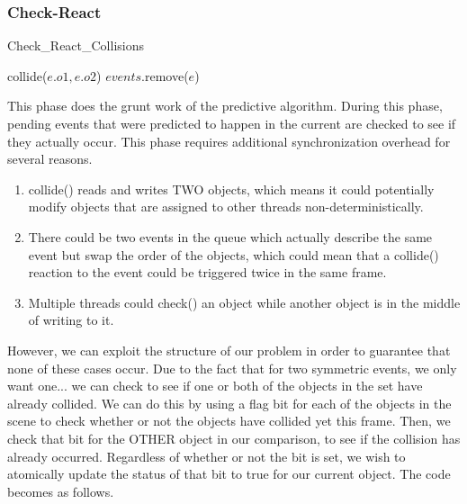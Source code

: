 \documentclass[CEJCS,PDF]{cej} %
\begin{document}
\subsubsection{Check-React}
\label{sub:checkreact}
\begin{algorithm}
\caption{Check\_React\_Collisions}
\begin{algorithmic}
\STATE {}
	\STATE {}
		\STATE {}
		\STATE collide($e.o1,e.o2$)
	\ENDIF
	\STATE {}
	\STATE $events$.remove($e$)
\ENDFOR
\end{algorithmic}
\end{algorithm}
This phase does the grunt work of the predictive algorithm.  During this phase, pending events that were predicted to happen in the current  are checked to see if they actually occur.  This phase requires additional synchronization overhead for several reasons.

\begin{enumerate}
	\item collide() reads and writes TWO objects, which means it could potentially modify objects that are assigned to other threads non-deterministically.
	\item There could be two events in the queue which actually describe the same event but swap the order of the objects, which could mean that a collide() reaction to the event could be triggered twice in the same frame.
	\item Multiple threads could check() an object while another object is in the middle of writing to it.
\end{enumerate}

However, we can exploit the structure of our problem in order to guarantee that none of these cases occur.  Due to the fact that for two symmetric events, we only want one... we can check to see if one or both of the objects in the set have already collided.
We can do this by using a flag bit for each of the objects in the scene to check whether or not the objects have collided yet this frame.  Then, we check
that bit for the OTHER object in our comparison, to see if the collision has already occurred.  Regardless of whether or not the bit is set, we wish to atomically
update the status of that bit to true for our current object.  The code becomes as follows.
\end{document}
